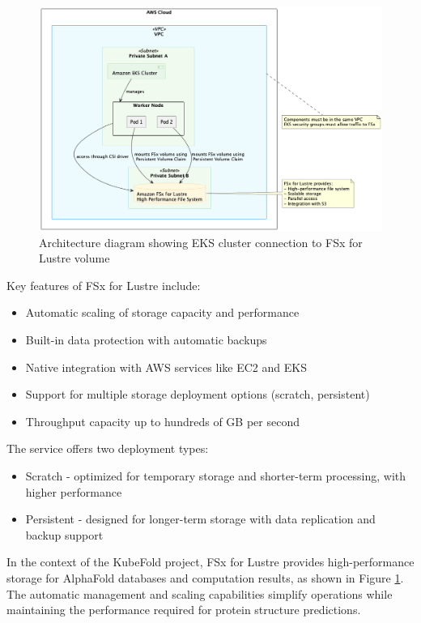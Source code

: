\begin{figure}[htbp]
    \centering
    \includegraphics[width=\textwidth]{images/fsx.png}
    \caption{Architecture diagram showing EKS cluster connection to FSx for Lustre volume}
    \label{fig:fsx-architecture}
\end{figure}

Key features of FSx for Lustre include:
\begin{itemize}
    \item Automatic scaling of storage capacity and performance
    \item Built-in data protection with automatic backups
    \item Native integration with AWS services like EC2 and EKS
    \item Support for multiple storage deployment options (scratch, persistent)
    \item Throughput capacity up to hundreds of GB per second
\end{itemize}

The service offers two deployment types:
\begin{itemize}
    \item Scratch - optimized for temporary storage and shorter-term processing, with higher performance
    \item Persistent - designed for longer-term storage with data replication and backup support
\end{itemize}

In the context of the KubeFold project, FSx for Lustre provides high-performance storage for AlphaFold databases and computation results, as shown in Figure \ref{fig:fsx-architecture}.
The automatic management and scaling capabilities simplify operations while maintaining the performance required for protein structure predictions.

